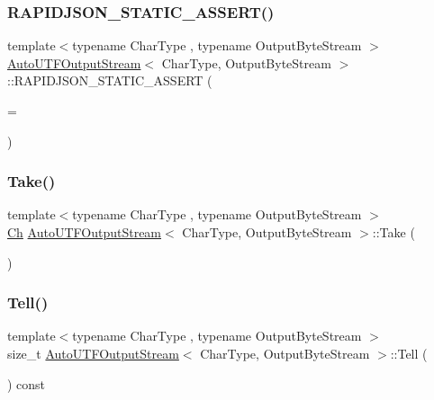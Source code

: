 \subsubsection{\texorpdfstring{R\+A\+P\+I\+D\+J\+S\+O\+N\+\_\+\+S\+T\+A\+T\+I\+C\+\_\+\+A\+S\+S\+E\+R\+T()}{RAPIDJSON\_STATIC\_ASSERT()}}
{\footnotesize\ttfamily template$<$typename Char\+Type , typename Output\+Byte\+Stream $>$ \\
\hyperlink{classAutoUTFOutputStream}{Auto\+U\+T\+F\+Output\+Stream}$<$ Char\+Type, Output\+Byte\+Stream $>$\+::R\+A\+P\+I\+D\+J\+S\+O\+N\+\_\+\+S\+T\+A\+T\+I\+C\+\_\+\+A\+S\+S\+E\+RT (\begin{DoxyParamCaption}\item[{sizeof(typename Output\+Byte\+Stream\+::\+Ch)}]{ = {} }\end{DoxyParamCaption})\hspace{0.3cm}{\ttfamily [private]}}

\mbox{\label{classAutoUTFOutputStream_a44ee7d84ba13fece17574d01b7be574b}} 
\subsubsection{\texorpdfstring{Take()}{Take()}}
{\footnotesize\ttfamily template$<$typename Char\+Type , typename Output\+Byte\+Stream $>$ \\
\hyperlink{classAutoUTFOutputStream_abd8c486101026e11828e86c18991c9c0}{Ch} \hyperlink{classAutoUTFOutputStream}{Auto\+U\+T\+F\+Output\+Stream}$<$ Char\+Type, Output\+Byte\+Stream $>$\+::Take (\begin{DoxyParamCaption}{ }\end{DoxyParamCaption})\hspace{0.3cm}{\ttfamily [inline]}}

\mbox{\label{classAutoUTFOutputStream_a81acbe33d84a28b7d5040d576ae22b5a}} 
\subsubsection{\texorpdfstring{Tell()}{Tell()}}
{\footnotesize\ttfamily template$<$typename Char\+Type , typename Output\+Byte\+Stream $>$ \\
size\+\_\+t \hyperlink{classAutoUTFOutputStream}{Auto\+U\+T\+F\+Output\+Stream}$<$ Char\+Type, Output\+Byte\+Stream $>$\+::Tell (\begin{DoxyParamCaption}{ }\end{DoxyParamCaption}) const\hspace{0.3cm}{\ttfamily [inline]}}



